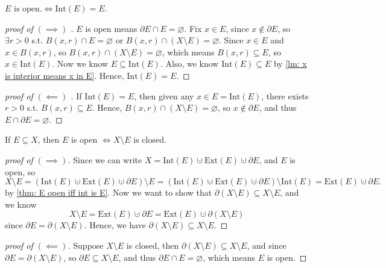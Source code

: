 \begin{theorem} \label{thm: E open iff int is E}
    \(E \text{ is open.} \iff \mathrm{Int}(E) = E \). 
\end{theorem}
\begin{proof}[proof of \((\implies )\) ]
    \(E\) is open means \(\partial E \cap E = \varnothing \). Fix \(x \in E\), since \(x \notin \partial E\), so \(\exists r > 0\) s.t. \(B(x,r) \cap E = \varnothing \) or \(B(x,r) \cap (X \setminus E) = \varnothing \). Since \(x \in E\) and \(x \in B(x,r)\), so \(B(x,r) \cap (X \setminus E) = \varnothing \), which means \(B(x,r) \subseteq E\), so \(x \in \mathrm{Int} (E)\). Now we know \(E \subseteq \mathrm{Int}(E) \). Also, we know \(\mathrm{Int}(E) \subseteq E \) by \autoref{lm: x is interior means x in E}. Hence, \(\mathrm{Int}(E) = E \).           
\end{proof}
\begin{proof}[proof of \((\impliedby )\) ]
    If \(\mathrm{Int}(E) = E \), then given any \(x \in E = \mathrm{Int}(E) \), there exists \(r>0\) s.t. \(B(x,r) \subseteq E\). Hence, \(B(x,r) \cap (X \setminus E) = \varnothing \), so \(x \notin \partial E\), and thus \(E \cap \partial E = \varnothing \).     
\end{proof}

\begin{theorem} \label{thm: E open iff X--E closed}
    If \(E \subseteq X\), then \(E\) is open \(\iff X \setminus E\) is closed.  
\end{theorem}
\begin{proof}[proof of \((\implies )\)]
    Since we can write \(X = \mathrm{Int}(E) \cupdot \mathrm{Ext}(E) \cupdot \partial E\), and \(E\) is open, so 
    \[
        X \setminus E = (\mathrm{Int}(E) \cupdot \mathrm{Ext}(E) \cupdot \partial E) \setminus E = (\mathrm{Int}(E) \cupdot \mathrm{Ext}(E) \cupdot \partial E) \setminus \mathrm{Int}(E) = \mathrm{Ext}(E) \cupdot \partial E.
    \] by \autoref{thm: E open iff int is E}. Now we want to show that \(\partial (X \setminus E) \subseteq X \setminus E\), and we know 
    \[
        X \setminus E = \mathrm{Ext}(E) \cupdot \partial E = \mathrm{Ext}(E) \cupdot \partial (X \setminus E)  
    \] since \(\partial E = \partial (X \setminus E)\). Hence, we have \(\partial (X \setminus E) \subseteq X\setminus E\).  
\end{proof}
\begin{proof}[proof of \((\impliedby) \)]
    Suppose \(X \setminus E\) is closed, then \(\partial (X \setminus E) \subseteq X \setminus E\), and since \(\partial E = \partial (X \setminus E)\), so \(\partial E \subseteq X \setminus E\), and thus \(\partial E \cap E = \varnothing\), which means \(E\) is open.     
\end{proof}